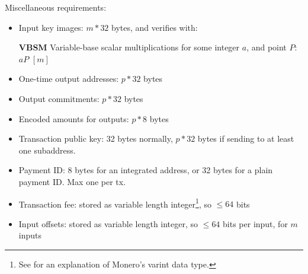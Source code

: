 Miscellaneous requirements:
\begin{itemize}
    \setlength\itemsep{\listspace}
    \item Input key images: $m*32$ bytes, and verifies with:
    \item [\textbf{VBSM}] Variable-base scalar multiplications for some integer $a$, and point $P$: $a P$ \quad \([m]\)
    \item One-time output addresses: $p*32$ bytes
    \item Output commitments: $p*32$ bytes
    \item Encoded amounts for outputs: $p*8$ bytes
    \item Transaction public key: 32 bytes normally, $p*32$ bytes if sending to at least one subaddress.
    \item Payment ID: 8 bytes for an integrated address, or 32 bytes for a plain payment ID. Max one per tx.
    \item Transaction fee: stored as variable length integer\footnote{See \cite{varint-description} for an explanation of Monero's varint data type.}, so $\leq 64$ bits
    \item Input offsets: stored as variable length integer, so $\leq 64$ bits per input, for $m$ inputs
\end{itemize}
